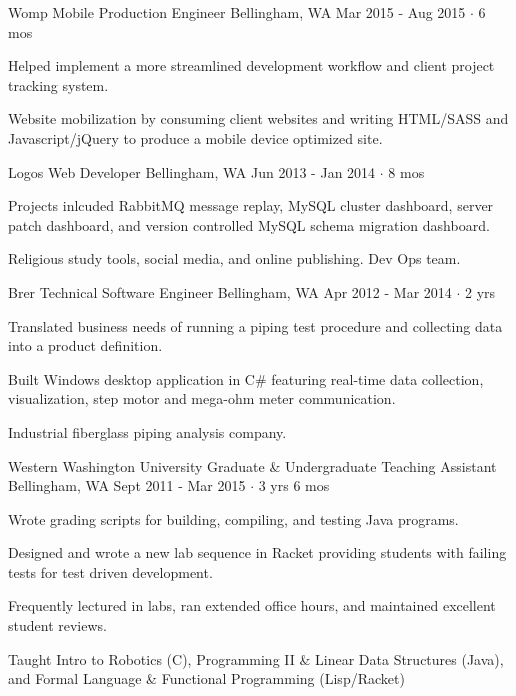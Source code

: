 \documentclass[11pt, a4paper]{awesome-cv}
\begin{document}
\begin{cventries}
  \cventry
    {Womp Mobile} %
    {Production Engineer} %
    {Bellingham, WA} %
    {Mar 2015 - Aug 2015  $\cdot$ 6 mos} %
    {
      \begin{cvitems} %
        \item Helped implement a more streamlined development workflow and client project tracking system.
      \end{cvitems}
    }
    {
      Website mobilization by consuming client websites and writing HTML/SASS and Javascript/jQuery to produce a mobile device optimized site.
    }

  \cventry
    {Logos} %
    {Web Developer} %
    {Bellingham, WA} %
    {Jun 2013 - Jan 2014  $\cdot$ 8 mos} %
    {
      \begin{cvitems} %
        \item Projects inlcuded RabbitMQ message replay, MySQL cluster dashboard, server patch dashboard, and version controlled MySQL schema migration dashboard.
      \end{cvitems}
    }
    {
      Religious study tools, social media, and online publishing. Dev Ops team.
    }

  \cventry
    {Brer Technical} %
    {Software Engineer} %
    {Bellingham, WA} %
    {Apr 2012 - Mar 2014  $\cdot$ 2 yrs} %
    {
      \begin{cvitems} %
        \item Translated business needs of running a piping test procedure and collecting data into a product definition.
        \item Built Windows desktop application in C\# featuring real-time data collection, visualization, step motor and mega-ohm meter communication.
      \end{cvitems}
    }
    {Industrial fiberglass piping analysis company.}

  \cventry
    {Western Washington University} %
    {Graduate \& Undergraduate Teaching Assistant} %
    {Bellingham, WA} %
    {Sept 2011 - Mar 2015  $\cdot$ 3 yrs 6 mos} %
    {
      \begin{cvitems} %
        \item Wrote grading scripts for building, compiling, and testing Java programs.
        \item Designed and wrote a new lab sequence in Racket providing students with failing tests for test driven development.
        \item Frequently lectured in labs, ran extended office hours, and maintained excellent student reviews.
      \end{cvitems}
    }
    {Taught Intro to Robotics (C), Programming II \& Linear Data Structures (Java), and Formal Language \& Functional Programming (Lisp/Racket)}

\end{cventries}
\end{document}
